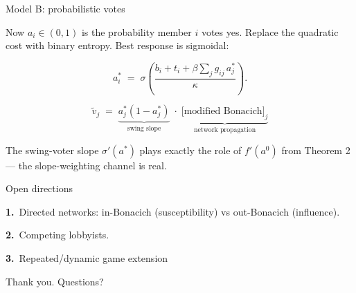 \documentclass[aspectratio=169]{beamer}
\newcommand{\accentline}{\vspace{1pt}{\color{accent}\rule{0.3\textwidth}{1.5pt}}\vspace{4pt}}
\begin{document}
\begin{frame}{Model B: probabilistic votes}
\accentline
\vspace{6pt}

{\small Now $a_i \in (0,1)$ is the probability member $i$ votes yes. Replace the quadratic cost with binary entropy. Best response is sigmoidal:}

\[
    a_i^* \;=\; \sigma\!\left(\frac{b_i + t_i + \beta \sum_j g_{ij}\, a_j^*}{\kappa}\right).
\]

\vspace{4pt}

\begin{center}
\[
    \tilde v_j \;=\; \underbrace{a_j^*(1 - a_j^*)}_{\text{swing slope}} \;\cdot\; \underbrace{\bigl[\text{modified Bonacich}\bigr]_j}_{\text{network propagation}}
\]
\end{center}

\vspace{6pt}

{\small The swing-voter slope $\sigma'(a^*)$ plays exactly the role of $f'(a^0)$ from Theorem 2 --- the slope-weighting channel is real.}
\end{frame}

\begin{frame}{Open directions}
\accentline
\vspace{14pt}

{\small\color{accent}\bfseries 1.}\, {\small Directed networks: in-Bonacich (susceptibility) vs out-Bonacich (influence).}

\vspace{12pt}

{\small\color{accent}\bfseries 2.}\, {\small Competing lobbyists.}

\vspace{12pt}

{\small\color{accent}\bfseries 3.}\, {\small Repeated/dynamic game extension}

\vspace{30pt}

\begin{center}
{\small\color{midgray} Thank you. Questions?}
\end{center}
\end{frame}
\end{document}
